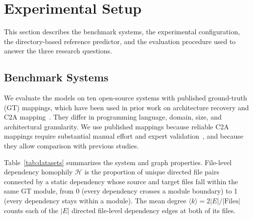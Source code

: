 \section{Experimental Setup}

This section describes the benchmark systems, the experimental configuration, the directory-based reference predictor, and the evaluation procedure used to answer the three research questions.

\subsection{Benchmark Systems\label{sec:benchmark_systems}}

We evaluate the models on ten open-source systems with published ground-truth (GT) mappings, which have been used in prior work on architecture recovery and C2A mapping~\cite{gaer,olsson2022automatically}. They differ in programming language, domain, size, and architectural granularity. We use published mappings because reliable C2A mappings require substantial manual effort and expert validation~\cite{garcia2013}, and because they allow comparison with previous studies.

Table~\ref{tab:datasets} summarizes the system and graph properties. File-level dependency homophily $\mathcal{H}$ is the proportion of unique directed file pairs connected by a static dependency whose source and target files fall within the same GT module, from 0 (every dependency crosses a module boundary) to 1 (every dependency stays within a module). The mean degree $\langle k \rangle = 2|E|/|\text{Files}|$ counts each of the $|E|$ directed file-level dependency edges at both of its files.

